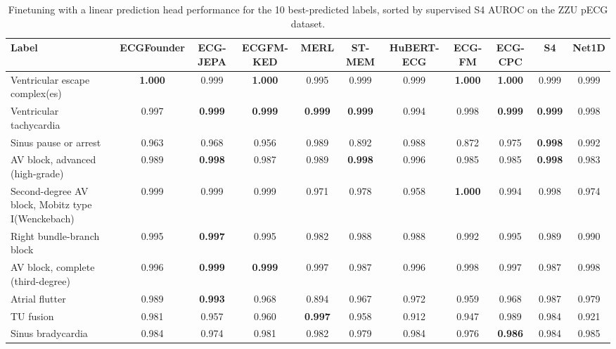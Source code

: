 \documentclass{article}
\begin{document}
                \begin{table}[htbp]
                    \centering
                    \tiny
                    \setlength{\tabcolsep}{2pt}
                    \caption{Finetuning with a linear prediction head performance for the 10 best-predicted labels, sorted by supervised S4 AUROC on the ZZU pECG dataset.}
                    \begin{tabular}{lcccccccccc}
                        \toprule
                        \textbf{Label} & \textbf{ECGFounder} & \textbf{ECG-JEPA} & \textbf{ECGFM-KED} & \textbf{MERL} & \textbf{ST-MEM} & \textbf{HuBERT-ECG} & \textbf{ECG-FM} & \textbf{ECG-CPC} & \textbf{S4} & \textbf{Net1D} \\
                        \midrule
                        Ventricular escape complex(es) & \textbf{1.000} & 0.999 & \textbf{1.000} & 0.995 & 0.999 & 0.999 & \textbf{1.000} & \textbf{1.000} & 0.999 & 0.999 \\
                        Ventricular tachycardia & 0.997 & \textbf{0.999} & \textbf{0.999} & \textbf{0.999} & \textbf{0.999} & 0.994 & 0.998 & \textbf{0.999} & \textbf{0.999} & 0.998 \\
                        Sinus pause or arrest & 0.963 & 0.968 & 0.956 & 0.989 & 0.892 & 0.988 & 0.872 & 0.975 & \textbf{0.998} & 0.992 \\
                        AV block, advanced (high-grade) & 0.989 & \textbf{0.998} & 0.987 & 0.989 & \textbf{0.998} & 0.996 & 0.985 & 0.985 & \textbf{0.998} & 0.983 \\
                        Second-degree AV block, Mobitz type I(Wenckebach) & 0.999 & 0.999 & 0.999 & 0.971 & 0.978 & 0.958 & \textbf{1.000} & 0.994 & 0.998 & 0.974 \\
                        Right bundle-branch block & 0.995 & \textbf{0.997} & 0.995 & 0.982 & 0.988 & 0.988 & 0.992 & 0.995 & 0.989 & 0.990 \\
                        AV block, complete (third-degree) & 0.996 & \textbf{0.999} & \textbf{0.999} & 0.997 & 0.987 & 0.996 & 0.998 & 0.997 & 0.987 & 0.998 \\
                        Atrial flutter & 0.989 & \textbf{0.993} & 0.968 & 0.894 & 0.967 & 0.972 & 0.959 & 0.968 & 0.987 & 0.979 \\
                        TU fusion & 0.981 & 0.957 & 0.960 & \textbf{0.997} & 0.958 & 0.912 & 0.947 & 0.989 & 0.984 & 0.921 \\
                        Sinus bradycardia & 0.984 & 0.974 & 0.981 & 0.982 & 0.979 & 0.984 & 0.976 & \textbf{0.986} & 0.984 & 0.985 \\
                        \bottomrule
                    \end{tabular}
                    \label{tab:results_overview_zzupecg}
                \end{table}
\end{document}
